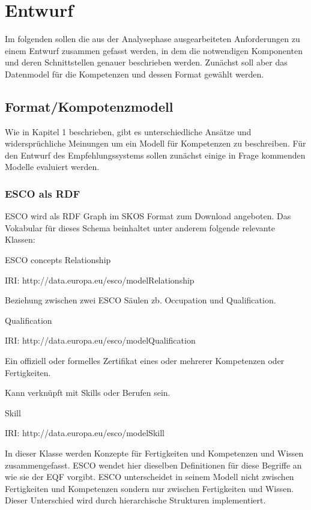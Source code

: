 \section{Entwurf}\label{entwurf}

Im folgenden sollen die aus der Analysephase  ausgearbeiteten Anforderungen zu einem Entwurf zusammen gefasst werden, in dem die notwendigen Komponenten und deren Schnittstellen genauer beschrieben werden. Zunächst soll aber das Datenmodel für die Kompetenzen und dessen Format gewählt werden.

\subsection{Format/Kompotenzmodell}

Wie in Kapitel 1 beschrieben, gibt es unterschiedliche Ansätze und widersprüchliche Meinungen um ein Modell für Kompetenzen zu beschreiben. Für den Entwurf des Empfehlungssystems sollen zunächst einige in Frage kommenden Modelle evaluiert werden. 

\subsubsection{ESCO als RDF}

ESCO wird als RDF Graph im SKOS Format zum Download angeboten. Das Vokabular für dieses Schema beinhaltet unter anderem folgende relevante Klassen: 

ESCO concepts Relationship

IRI: http://data.europa.eu/esco/modelRelationship


Beziehung zwischen zwei ESCO Säulen zb. Occupation und Qualification.

Qualification 

IRI: http://data.europa.eu/esco/modelQualification

Ein offiziell oder formelles Zertifikat eines oder mehrerer Kompetenzen oder Fertigkeiten.

Kann verknüpft mit Skills oder Berufen sein.

Skill 

IRI: http://data.europa.eu/esco/modelSkill

In dieser Klasse werden Konzepte für Fertigkeiten und Kompetenzen und Wissen zusammengefasst. ESCO wendet hier dieselben Definitionen für diese Begriffe an wie sie der EQF vorgibt.\cite{https://ec.europa.eu/esco/portal/escopedia/Competence}
ESCO unterscheidet in seinem Modell nicht zwischen Fertigkeiten und Kompetenzen sondern nur zwischen Fertigkeiten und Wissen. Dieser Unterschied wird durch hierarchische Strukturen implementiert.  


